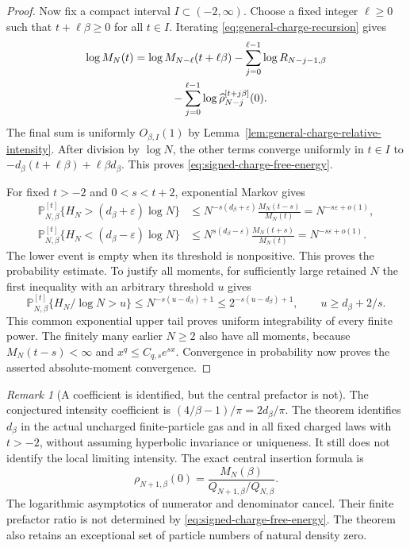 \documentclass[11pt,a4paper]{article}
\numberwithin{equation}{section}
\theoremstyle{definition}
\theoremstyle{remark}
\newtheorem{remark}[theorem]{Remark}
\begin{document}
\begin{proof}
Now fix a compact interval $I\subset(-2,\infty)$.  Choose a fixed
integer $\ell\ge0$ such that $t+\ell\beta\ge0$ for all $t\in I$.
Iterating \eqref{eq:general-charge-recursion} gives
\begin{align*}
 \log M_N(t)
 &=\log M_{N-\ell}(t+\ell\beta)
   -\sum_{j=0}^{\ell-1}\log R_{N-j-1,\beta}\\
 &\hspace{12mm}
   -\sum_{j=0}^{\ell-1}
                 \log\widehat\rho_{N-j}^{[t+j\beta]}(0).
\end{align*}
The final sum is uniformly $O_{\beta,I}(1)$ by
Lemma~\ref{lem:general-charge-relative-intensity}.
After division by $\log N$, the other terms converge uniformly in
$t\in I$ to $-d_\beta(t+\ell\beta)+\ell\beta d_\beta$.
This proves \eqref{eq:signed-charge-free-energy}.

For fixed $t>-2$ and $0<s<t+2$, exponential Markov gives
\begin{align*}
 \mathbb P_{N,\beta}^{[t]}
 \{H_N>(d_\beta+\varepsilon)\log N\}
 &\le N^{-s(d_\beta+\varepsilon)}\frac{M_N(t-s)}{M_N(t)}
       =N^{-s\varepsilon+o(1)},\\
 \mathbb P_{N,\beta}^{[t]}
 \{H_N<(d_\beta-\varepsilon)\log N\}
 &\le N^{s(d_\beta-\varepsilon)}\frac{M_N(t+s)}{M_N(t)}
       =N^{-s\varepsilon+o(1)}.
\end{align*}
The lower event is empty when its threshold is nonpositive.
This proves the probability estimate.  To justify all moments,
for sufficiently large retained $N$ the first inequality with an
arbitrary threshold $u$ gives
\[
 \mathbb P_{N,\beta}^{[t]}\{H_N/\log N>u\}
 \le N^{-s(u-d_\beta)+1}
 \le 2^{-s(u-d_\beta)+1},\qquad u\ge d_\beta+2/s.
\]
This common exponential upper tail proves uniform integrability of
every finite power.  The finitely many earlier $N\ge2$ also have
all moments, because $M_N(t-s)<\infty$ and $x^q\le C_{q,s}e^{sx}$.
Convergence in probability now proves the asserted absolute-moment
convergence.
\end{proof}

\begin{remark}[A coefficient is identified, but the central prefactor is not]
The conjectured intensity coefficient is
$(4/\beta-1)/\pi=2d_\beta/\pi$.  The theorem identifies $d_\beta$
in the actual uncharged finite-particle gas and in all fixed charged
laws with $t>-2$, without assuming hyperbolic invariance or uniqueness.
It still does not identify the local limiting intensity.  The exact
central insertion formula is
\[
 \rho_{N+1,\beta}(0)=
       \frac{M_N(\beta)}{Q_{N+1,\beta}/Q_{N,\beta}}.
\]
The logarithmic asymptotics of numerator and denominator cancel.
Their finite prefactor ratio is not determined by
\eqref{eq:signed-charge-free-energy}.  The theorem also retains an
exceptional set of particle numbers of natural density zero.
\end{remark}
\end{document}
